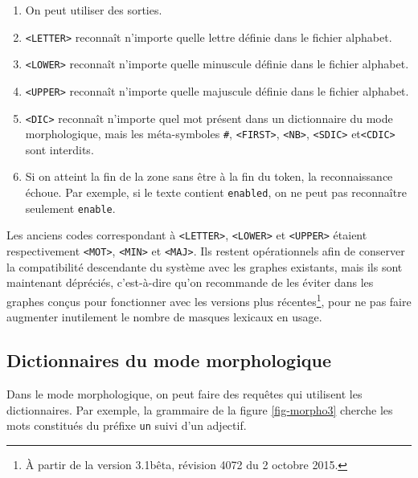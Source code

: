 \begin{enumerate}
\item On peut utiliser des sorties.
   
\item \verb+<LETTER>+ reconnaît n'importe quelle lettre définie dans le fichier alphabet.

\item \verb+<LOWER>+ reconnaît n'importe quelle minuscule définie dans le fichier alphabet.

\item \verb+<UPPER>+ reconnaît n'importe quelle majuscule définie dans le fichier alphabet.

\item \verb+<DIC>+ reconnaît n'importe quel mot présent dans un dictionnaire du mode
	 morphologique, mais les méta-symboles \verb+#+, \verb+<FIRST>+,  \verb+<NB>+,
 	 \verb+<SDIC>+ et\verb+<CDIC>+ sont interdits.\index{\verbt{\#}}     
\item Si on atteint la fin de la zone sans être à la fin du token, la reconnaissance échoue.
	Par exemple, si le texte contient \verb+enabled+, on ne peut pas reconnaître seulement
	\verb+enable+.
\end{enumerate}

\noindent  Les anciens codes correspondant à \verb+<LETTER>+, \verb+<LOWER>+ et \verb+<UPPER>+
 étaient respectivement \verb+<MOT>+, \verb+<MIN>+ et \verb+<MAJ>+.
 Ils restent opérationnels afin de conserver la compatibilité descendante
 du système avec les graphes existants, mais ils sont maintenant dépréciés,
 c'est-à-dire qu'on recommande de les éviter dans les graphes conçus pour fonctionner avec les versions plus récentes\footnote{À partir de la version 3.1bêta, révision 4072 du 2 octobre 2015.},
pour ne pas faire augmenter inutilement le nombre de masques lexicaux en usage.

\subsection{Dictionnaires du mode morphologique}
\label{dic-mode-morpho}
Dans le mode morphologique, on peut faire des requêtes qui utilisent les dictionnaires.
Par exemple,  la grammaire de la figure \ref{fig-morpho3} cherche les mots constitués du préfixe \verb+un+ suivi d'un adjectif.

